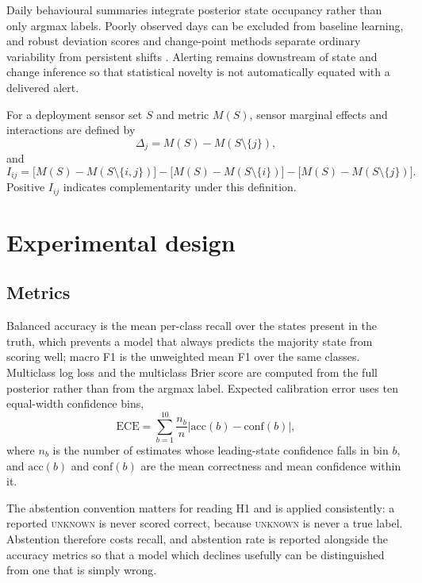 \documentclass[11pt]{article}
\begin{document}
Daily behavioural summaries integrate posterior state occupancy rather than only argmax labels. Poorly observed days can be excluded from baseline learning, and robust deviation scores and change-point methods separate ordinary variability from persistent shifts \citep{killick2012pelt}. Alerting remains downstream of state and change inference so that statistical novelty is not automatically equated with a delivered alert.

For a deployment sensor set $S$ and metric $M(S)$, sensor marginal effects and interactions are defined by
\begin{equation}
\Delta_j=M(S)-M(S\setminus\{j\}),
\end{equation}
and
\begin{equation}
I_{ij}=\big[M(S)-M(S\setminus\{i,j\})\big]
-\big[M(S)-M(S\setminus\{i\})\big]
-\big[M(S)-M(S\setminus\{j\})\big].
\end{equation}
Positive $I_{ij}$ indicates complementarity under this definition.

\section{Experimental design}
\label{sec:experiments}

\subsection{Metrics}
\label{sec:metrics}

Balanced accuracy is the mean per-class recall over the states present in the
truth, which prevents a model that always predicts the majority state from
scoring well; macro F1 is the unweighted mean F1 over the same classes.
Multiclass log loss and the multiclass Brier score are computed from the full
posterior rather than from the argmax label. Expected calibration error uses ten
equal-width confidence bins,
\begin{equation}
\mathrm{ECE}=\sum_{b=1}^{10}\frac{n_b}{n}\big|\mathrm{acc}(b)-\mathrm{conf}(b)\big|,
\end{equation}
where $n_b$ is the number of estimates whose leading-state confidence falls in
bin $b$, and $\mathrm{acc}(b)$ and $\mathrm{conf}(b)$ are the mean correctness
and mean confidence within it.

The abstention convention matters for reading H1 and is applied consistently: a
reported \textsc{unknown} is never scored correct, because \textsc{unknown} is
never a true label. Abstention therefore costs recall, and abstention rate is
reported alongside the accuracy metrics so that a model which declines usefully
can be distinguished from one that is simply wrong.
\end{document}
